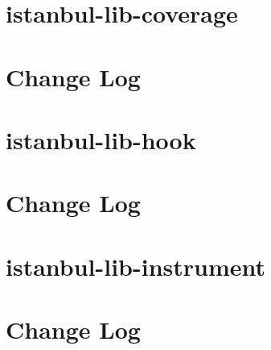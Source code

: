 \documentclass[twoside]{book}
\newcommand{\+}{\discretionary{\mbox{\scriptsize$\hookleftarrow$}}{}{}}
\begin{document}
\chapter{istanbul-\/lib-\/coverage}
\label{md__c_1_workspace_demo_src_main_script_node_modules_istanbul-lib-coverage__r_e_a_d_m_e}

\chapter{Change Log}
\label{md__c_1_workspace_demo_src_main_script_node_modules_istanbul-lib-hook__c_h_a_n_g_e_l_o_g}

\chapter{istanbul-\/lib-\/hook}
\label{md__c_1_workspace_demo_src_main_script_node_modules_istanbul-lib-hook__r_e_a_d_m_e}

\chapter{Change Log}
\label{md__c_1_workspace_demo_src_main_script_node_modules_istanbul-lib-instrument__c_h_a_n_g_e_l_o_g}

\chapter{istanbul-\/lib-\/instrument}
\label{md__c_1_workspace_demo_src_main_script_node_modules_istanbul-lib-instrument__r_e_a_d_m_e}

\chapter{Change Log}
\label{md__c_1_workspace_demo_src_main_script_node_modules_istanbul-lib-report__c_h_a_n_g_e_l_o_g}

\end{document}
